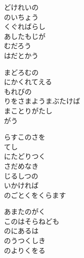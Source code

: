 \documentclass[10pt,b5j]{tarticle} %
\begin{document}
\vspace{1.5em} %
\newcommand{\linespace}{0.5em} %
\newcommand{\blocksize}{0.5\hsize} %
\begin{enumerate} %
    \begin{minipage}[c]{\blocksize}
    
        \vspace{\linespace}
        \item
        どけれいの\\
        のいちょう\\
        くぐればらし\\
        あしたもじが\\
        むだろう\\
        はだとかう
        
        \vspace{\linespace}
        \item
        まどろむの\\
        にかくれてえる\\
        もれびの\\
        りをさまようまぶたけば\\
        まことりがたし\\
        がう
        
        \vspace{\linespace}
        \item
        らすこのさを\\
        てし\\
        にたどりつく\\
        さだめなき\\
        じるしつの\\
        いかければ\\
        のごとくをくらます
        
        \vspace{\linespace}
        \item
        あまたのがく\\
        このはそらねども\\
        のにあるは\\
        のうつくしき\\
        のよりくをる
        

\end{minipage}
\end{enumerate}
\end{document}
